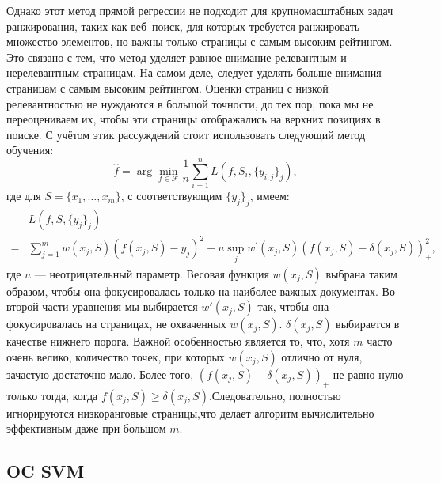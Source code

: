 Однако этот метод прямой регрессии не подходит для крупномасштабных задач ранжирования, таких как веб--поиск, для которых требуется ранжировать множество элементов, но важны только страницы с самым высоким рейтингом. Это связано с тем, что метод уделяет равное внимание релевантным и нерелевантным страницам. На самом деле, следует уделять больше внимания страницам с самым высоким рейтингом. Оценки страниц с низкой релевантностью не нуждаются в большой точности, до тех пор, пока мы не переоцениваем их, чтобы эти страницы отображались на верхних позициях в поиске. С учётом этик рассуждений стоит использовать следующий метод обучения: 
\[
\hat{f}=\arg \min _{f \in \mathcal{F}} \frac{1}{n} \sum_{i=1}^n L(f, S_i,\{y_{i, j}\}_j),
\]
где для $S = \{x_{1}, \dots, x_{m}\}$, с соответствующим $\{y_{j}\}_{j}$, имеем:
\[
\begin{aligned}
	& L(f, S,\{y_j\}_j) \\
	= & \sum_{j=1}^m w(x_j, S)(f(x_j, S)-y_j)^2+u \sup _j w^{\prime}(x_j, S)(f(x_j, S)-\delta(x_j, S))_{+}^2,
\end{aligned}
\]
где $u$ --- неотрицательный параметр. Весовая функция $w(x_j, S)$ выбрана таким образом, чтобы она фокусировалась только на наиболее важных документах. Во второй части уравнения мы выбирается $w'(x_j, S)$ так, чтобы она фокусировалась на страницах, не охваченных $w(x_j, S)$. $\delta(x_j, S)$ выбирается в качестве нижнего порога. Важной особенностью является то, что, хотя $m$ часто очень велико, количество точек, при которых $w(x_j, S)$ отлично от нуля, зачастую достаточно мало. Более того, $(f(x_j, S)-\delta(x_j, S))_{+}$ не равно нулю только тогда, когда $f(x_j, S) \geq \delta(x_j, S)$.Следовательно, полностью игнорируются низкоранговые страницы,что делает алгоритм вычислительно эффективным даже при большом $m$. 



\subsection{OC SVM}

